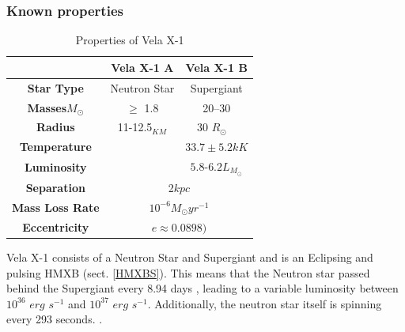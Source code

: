 \documentclass[12pt, a4paper]{article}
\begin{document}
    \begin{table}
            \subsubsection{Known properties}
            \begin{center}
                \begin{tabular}{||c || c | c||} 
                 \hline
                 & Vela X-1 A & Vela X-1 B  \\ 
                 \hline\hline
                 \textbf{Star Type} & Neutron Star & Supergiant \cite{Kretschmar_2021} \\ 
                 \hline
                 \textbf{Masses}\(M_\odot\) & $\ge$ 1.8 \cite{Kretschmar_2021} & 20–30 \cite{Kretschmar_2021} \\
                 \hline
                 \textbf{Radius} & 11-12.5$_{KM}$ \cite{Kretschmar_2021} & 30 \(R_\odot\)
                ~\cite{Kretschmar_2021} \\
                 \hline 
                 \textbf{Temperature} &  & $33.7 \pm 5.2 kK$ \cite{Kretschmar_2021}\\ 
                 \hline
                 \textbf{Luminosity} & & $5.8$-$6.2 L_{M_\odot}$ \cite{Kretschmar_2021} \\
                 \hline
                 \textbf{Separation} & \multicolumn{2}{c||}{2$kpc$ \cite{Kretschmar_2021}} \\
                 \hline 
                 \textbf{Mass Loss Rate} & \multicolumn{2}{c||}{$10^{-6} M_\odot yr^{-1}$ \cite{Kretschmar_2021}} \\
                 \hline
                 \textbf{Eccentricity} & \multicolumn{2}{c||}{$ e \approx  0.0898)$ \cite{Kretschmar_2021}} \\
                 \hline
                \end{tabular}
                \caption{Properties of Vela X-1} 
                \label{VelaX1} 

            \end{center}
    \end{table}

        Vela X-1 consists of a Neutron Star and Supergiant and is an Eclipsing and pulsing HMXB (sect. \ref{HMXBS}). This means that the Neutron star passed behind the Supergiant every 8.94 days \cite{Falanga_2015}, leading to a variable luminosity between $10^{36}$ $erg$ $s^{-1}$ and $10^{37}$ $erg$ $s^{-1}$. Additionally, the neutron star itself is spinning every 293 seconds. \cite{Kretschmar_2021}. 
        
\end{document}
